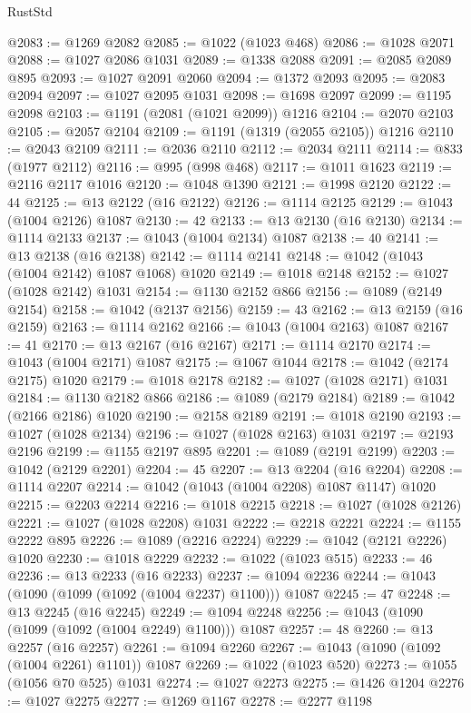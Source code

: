 \begin{lexlean}{RustStd}
\begin{coremodule}
@2083 := @1269 @2082
@2085 := @1022 (@1023 @468)
@2086 := @1028 @2071
@2088 := @1027 @2086 @1031
@2089 := @1338 @2088
@2091 := @2085 @2089 @895
@2093 := @1027 @2091 @2060
@2094 := @1372 @2093
@2095 := @2083 @2094
@2097 := @1027 @2095 @1031
@2098 := @1698 @2097
@2099 := @1195 @2098
@2103 := @1191 (@2081 (@1021 @2099)) @1216
@2104 := @2070 @2103
@2105 := @2057 @2104
@2109 := @1191 (@1319 (@2055 @2105)) @1216
@2110 := @2043 @2109
@2111 := @2036 @2110
@2112 := @2034 @2111
@2114 := @833 (@1977 @2112)
@2116 := @995 (@998 @468)
@2117 := @1011 @1623
@2119 := @2116 @2117 @1016
@2120 := @1048 @1390
@2121 := @1998 @2120
@2122 := 44
@2125 := @13 @2122 (@16 @2122)
@2126 := @1114 @2125
@2129 := @1043 (@1004 @2126) @1087
@2130 := 42
@2133 := @13 @2130 (@16 @2130)
@2134 := @1114 @2133
@2137 := @1043 (@1004 @2134) @1087
@2138 := 40
@2141 := @13 @2138 (@16 @2138)
@2142 := @1114 @2141
@2148 := @1042 (@1043 (@1004 @2142) @1087 @1068) @1020
@2149 := @1018 @2148
@2152 := @1027 (@1028 @2142) @1031
@2154 := @1130 @2152 @866
@2156 := @1089 (@2149 @2154)
@2158 := @1042 (@2137 @2156)
@2159 := 43
@2162 := @13 @2159 (@16 @2159)
@2163 := @1114 @2162
@2166 := @1043 (@1004 @2163) @1087
@2167 := 41
@2170 := @13 @2167 (@16 @2167)
@2171 := @1114 @2170
@2174 := @1043 (@1004 @2171) @1087
@2175 := @1067 @1044
@2178 := @1042 (@2174 @2175) @1020
@2179 := @1018 @2178
@2182 := @1027 (@1028 @2171) @1031
@2184 := @1130 @2182 @866
@2186 := @1089 (@2179 @2184)
@2189 := @1042 (@2166 @2186) @1020
@2190 := @2158 @2189
@2191 := @1018 @2190
@2193 := @1027 (@1028 @2134)
@2196 := @1027 (@1028 @2163) @1031
@2197 := @2193 @2196
@2199 := @1155 @2197 @895
@2201 := @1089 (@2191 @2199)
@2203 := @1042 (@2129 @2201)
@2204 := 45
@2207 := @13 @2204 (@16 @2204)
@2208 := @1114 @2207
@2214 := @1042 (@1043 (@1004 @2208) @1087 @1147) @1020
@2215 := @2203 @2214
@2216 := @1018 @2215
@2218 := @1027 (@1028 @2126)
@2221 := @1027 (@1028 @2208) @1031
@2222 := @2218 @2221
@2224 := @1155 @2222 @895
@2226 := @1089 (@2216 @2224)
@2229 := @1042 (@2121 @2226) @1020
@2230 := @1018 @2229
@2232 := @1022 (@1023 @515)
@2233 := 46
@2236 := @13 @2233 (@16 @2233)
@2237 := @1094 @2236
@2244 := @1043 (@1090 (@1099 (@1092 (@1004 @2237) @1100))) @1087
@2245 := 47
@2248 := @13 @2245 (@16 @2245)
@2249 := @1094 @2248
@2256 := @1043 (@1090 (@1099 (@1092 (@1004 @2249) @1100))) @1087
@2257 := 48
@2260 := @13 @2257 (@16 @2257)
@2261 := @1094 @2260
@2267 := @1043 (@1090 (@1092 (@1004 @2261) @1101)) @1087
@2269 := @1022 (@1023 @520)
@2273 := @1055 (@1056 @70 @525) @1031
@2274 := @1027 @2273
@2275 := @1426 @1204
@2276 := @1027 @2275
@2277 := @1269 @1167
@2278 := @2277 @1198

\end{coremodule}
\end{lexlean}
